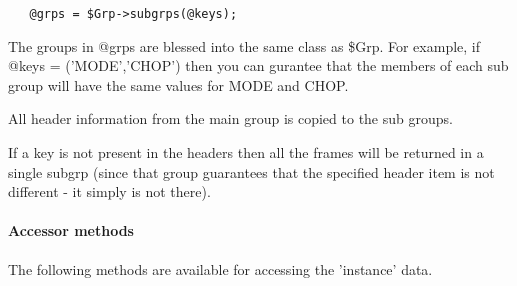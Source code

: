 \begin{description}
\begin{verbatim}
   @grps = $Grp->subgrps(@keys);
\end{verbatim}


The groups in @grps are blessed into the same class as \$Grp.
For example, if @keys = ('MODE','CHOP') then you can gurantee
that the members of each sub group will have the same values
for MODE and CHOP.



All header information from the main group is copied to the
sub groups.



If a key is not present in the headers then all the frames
will be returned in a single subgrp (since that group guarantees
that the specified header item is not different - it simply
is not there).

\end{description}
\paragraph*{Accessor methods\label{ORAC::Group_Accessor_methods}}


The following methods are available for accessing the 
'instance' data.

